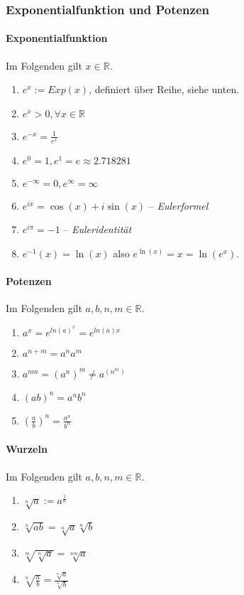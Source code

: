 \documentclass[a4paper, 9pt, DIV=24]{scrartcl}
\begin{document}
\subsubsection{Exponentialfunktion und Potenzen}
\paragraph{Exponentialfunktion} Im Folgenden gilt $x \in\mathbb{R}$.
\begin{enumerate}[label={(}\arabic*{)}]
 \item $e^x := Exp(x)$, definiert über Reihe, siehe unten.
 \item $e^x > 0, \forall x\in\mathbb{R}$
 \item $e^{-x} = \frac{1}{e^x}$
 \item $e^0 = 1, e^1 = e \approx 2.718281$
 \item $e^{-\infty} = 0, e^{\infty} = \infty$
 \item $e^{ix} = \cos(x) + i\sin(x)$ – \emph{Eulerformel}
 \item $e^{i\pi} = -1$ – \emph{Euleridentität}
 \item $e^{-1}(x) = \ln(x)$ also $e^{\ln(x)} = x = \ln(e^x)$.
\end{enumerate}
\paragraph{Potenzen} Im Folgenden gilt $a,b,n,m \in\mathbb{R}$.
\begin{enumerate}[label={(}\arabic*{)}]
 \item $a^x = e^{ln(a)^{x}} = e^{ln(a)x}$
 \item $a^{n+m} = a^na^m$
 \item $a^{nm} = (a^n)^m \neq a^{(n^m)}$
 \item $(ab)^n = a^nb^n$
 \item $(\frac{a}{b})^n = \frac{a^n}{b^n}$
\end{enumerate}
\paragraph{Wurzeln} Im Folgenden gilt $a,b,n,m \in\mathbb{R}$.
\begin{enumerate}[label={(}\arabic*{)}]
 \item $\sqrt[n]{a} := a^{\frac{1}{n}}$
 \item $\sqrt[n]{ab} = \sqrt[n]{a}\sqrt[n]{b}$
 \item $\sqrt[m]{\sqrt[n]{a}} = \sqrt[nm]{a}$
 \item $\sqrt[n]{\frac{a}{b}} = \frac{\sqrt[n]{a}}{\sqrt[n]{b}}$
\end{enumerate}
\end{document}
